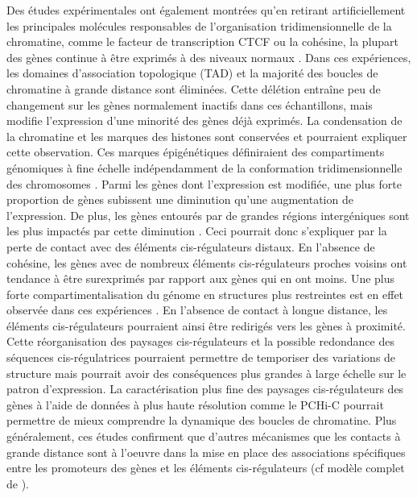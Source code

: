 Des études expérimentales ont également montrées qu’en retirant artificiellement les principales molécules responsables de l’organisation tridimensionnelle de la chromatine, comme le facteur de transcription CTCF ou la cohésine, la plupart des gènes continue à être exprimés à des niveaux normaux \citep{schwarzer_two_2017, rao_cohesin_2017}. Dans ces expériences, les domaines d’association topologique (TAD) et la majorité des boucles de chromatine à grande distance sont éliminées. Cette délétion entraîne peu de changement sur les gènes normalement inactifs dans ces échantillons, mais modifie l’expression d’une minorité des gènes déjà exprimés. La condensation de la chromatine et les marques des histones sont conservées et pourraient expliquer cette observation. Ces marques épigénétiques définiraient des compartiments génomiques à fine échelle indépendamment de la conformation tridimensionnelle des chromosomes \citep{schwarzer_two_2017}. Parmi les gènes dont l’expression est modifiée, une plus forte proportion de gènes subissent une diminution qu’une augmentation de l’expression. De plus, les gènes entourés par de grandes régions intergéniques sont les plus impactés par cette diminution \citep{schwarzer_two_2017}. Ceci pourrait donc s’expliquer par la perte de contact avec des éléments \gls{cis}-régulateurs distaux. En l’absence de cohésine, les gènes avec de nombreux éléments \gls{cis}-régulateurs proches voisins ont tendance à être surexprimés par rapport aux gènes qui en ont moins. Une plus forte compartimentalisation du génome en structures plus restreintes est en effet observée dans ces expériences \citep{rao_cohesin_2017}. En l’absence de contact à longue distance, les éléments \gls{cis}-régulateurs pourraient ainsi être redirigés vers les gènes à proximité. Cette réorganisation des paysages \gls{cis}-régulateurs et la possible redondance des séquences \gls{cis}-régulatrices pourraient permettre de temporiser des variations de structure mais pourrait avoir des conséquences plus grandes à large échelle sur le patron d’expression. La caractérisation plus fine des paysages \gls{cis}-régulateurs des gènes à l’aide de données à plus haute résolution comme le \acrshort{PCHi-C} pourrait permettre de mieux comprendre la dynamique des boucles de chromatine. Plus généralement, ces études confirment que d’autres mécanismes que les contacts à grande distance sont à l’oeuvre dans la mise en place des associations spécifiques entre les promoteurs des gènes et les éléments \gls{cis}-régulateurs (cf modèle complet de \citet{schoenfelder_long-range_2019}).

